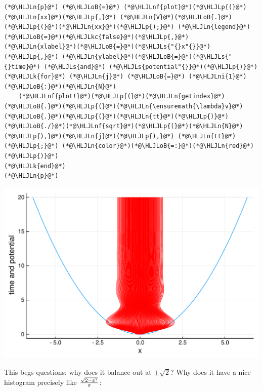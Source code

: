 \documentclass[12pt,a4paper]{article}
\newcommand{\HLJLk}[1]{\textcolor[RGB]{148,91,176}{\textbf{#1}}}
\newcommand{\HLJLkc}[1]{\textcolor[RGB]{59,151,46}{\textit{#1}}}
\newcommand{\HLJLn}[1]{#1}
\newcommand{\HLJLnf}[1]{\textcolor[RGB]{66,102,213}{#1}}
\newcommand{\HLJLs}[1]{\textcolor[RGB]{201,61,57}{#1}}
\newcommand{\HLJLni}[1]{\textcolor[RGB]{59,151,46}{#1}}
\newcommand{\HLJLoB}[1]{\textcolor[RGB]{102,102,102}{\textbf{#1}}}
\newcommand{\HLJLp}[1]{#1}
\begin{document}
\begin{lstlisting}
(*@\HLJLn{p}@*) (*@\HLJLoB{=}@*) (*@\HLJLnf{plot}@*)(*@\HLJLp{(}@*)(*@\HLJLn{xx}@*)(*@\HLJLp{,}@*) (*@\HLJLn{V}@*)(*@\HLJLoB{.}@*)(*@\HLJLp{(}@*)(*@\HLJLn{xx}@*)(*@\HLJLp{);}@*) (*@\HLJLn{legend}@*)(*@\HLJLoB{=}@*)(*@\HLJLkc{false}@*)(*@\HLJLp{,}@*) (*@\HLJLn{xlabel}@*)(*@\HLJLoB{=}@*)(*@\HLJLs{"{}x"{}}@*)(*@\HLJLp{,}@*) (*@\HLJLn{ylabel}@*)(*@\HLJLoB{=}@*)(*@\HLJLs{"{}time}@*) (*@\HLJLs{and}@*) (*@\HLJLs{potential"{}}@*)(*@\HLJLp{)}@*)
(*@\HLJLk{for}@*) (*@\HLJLn{j}@*) (*@\HLJLoB{=}@*) (*@\HLJLni{1}@*)(*@\HLJLoB{:}@*)(*@\HLJLn{N}@*)
    (*@\HLJLnf{plot!}@*)(*@\HLJLp{(}@*)(*@\HLJLn{getindex}@*)(*@\HLJLoB{.}@*)(*@\HLJLp{(}@*)(*@\HLJLn{\ensuremath{\lambda}v}@*)(*@\HLJLoB{.}@*)(*@\HLJLp{(}@*)(*@\HLJLn{tt}@*)(*@\HLJLp{)}@*)(*@\HLJLoB{./}@*)(*@\HLJLnf{sqrt}@*)(*@\HLJLp{(}@*)(*@\HLJLn{N}@*)(*@\HLJLp{),}@*)(*@\HLJLn{j}@*)(*@\HLJLp{),}@*) (*@\HLJLn{tt}@*)(*@\HLJLp{;}@*) (*@\HLJLn{color}@*)(*@\HLJLoB{=:}@*)(*@\HLJLn{red}@*)(*@\HLJLp{)}@*)
(*@\HLJLk{end}@*)
(*@\HLJLn{p}@*)
\end{lstlisting}

\includegraphics[width=\linewidth]{figures/Lecture16_5_1.pdf}

This begs questions: why does it balance out at $\pm \sqrt 2$?  Why does it have a nice histogram precisely like ${\sqrt{2-x^2} \over \pi}$:
\end{document}
